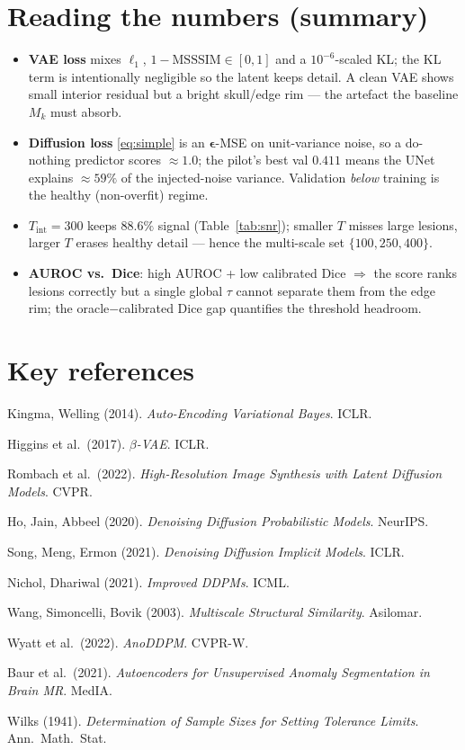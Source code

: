 \documentclass[12pt,a4paper]{article}
\theoremstyle{definition}
\theoremstyle{plain}
\newcommand{\eps}{\bm{\epsilon}}
\begin{document}
\section*{Reading the numbers (summary)}
\begin{itemize}[leftmargin=1.4em]
\item \textbf{VAE loss} mixes $\ell_1$, $1-\mathrm{MSSSIM}\in[0,1]$ and a
$10^{-6}$-scaled KL; the KL term is intentionally negligible so the latent keeps
detail. A clean VAE shows small interior residual but a bright skull/edge rim ---
the artefact the baseline $M_k$ must absorb.
\item \textbf{Diffusion loss} \eqref{eq:simple} is an $\eps$-MSE on unit-variance
noise, so a do-nothing predictor scores $\approx1.0$; the pilot's best
val $0.411$ means the UNet explains $\approx 59\%$ of the injected-noise variance.
Validation \emph{below} training is the healthy (non-overfit) regime.
\item \textbf{$T_{\mathrm{int}}=300$} keeps $88.6\%$ signal (Table~\ref{tab:snr});
smaller $T$ misses large lesions, larger $T$ erases healthy detail --- hence the
multi-scale set $\{100,250,400\}$.
\item \textbf{AUROC vs.\ Dice}: high AUROC + low calibrated Dice $\Rightarrow$ the
score ranks lesions correctly but a single global $\tau$ cannot separate them from
the edge rim; the oracle$-$calibrated Dice gap quantifies the threshold headroom.
\end{itemize}

\section*{Key references}
\begin{enumerate}[label={[\arabic*]},leftmargin=2.2em,itemsep=1pt]
\item Kingma, Welling (2014). \textit{Auto-Encoding Variational Bayes}. ICLR.
\item Higgins et al.\ (2017). \textit{$\beta$-VAE}. ICLR.
\item Rombach et al.\ (2022). \textit{High-Resolution Image Synthesis with Latent Diffusion Models}. CVPR.
\item Ho, Jain, Abbeel (2020). \textit{Denoising Diffusion Probabilistic Models}. NeurIPS.
\item Song, Meng, Ermon (2021). \textit{Denoising Diffusion Implicit Models}. ICLR.
\item Nichol, Dhariwal (2021). \textit{Improved DDPMs}. ICML.
\item Wang, Simoncelli, Bovik (2003). \textit{Multiscale Structural Similarity}. Asilomar.
\item Wyatt et al.\ (2022). \textit{AnoDDPM}. CVPR-W.
\item Baur et al.\ (2021). \textit{Autoencoders for Unsupervised Anomaly Segmentation in Brain MR}. MedIA.
\item Wilks (1941). \textit{Determination of Sample Sizes for Setting Tolerance Limits}. Ann.\ Math.\ Stat.
\end{enumerate}
\end{document}
